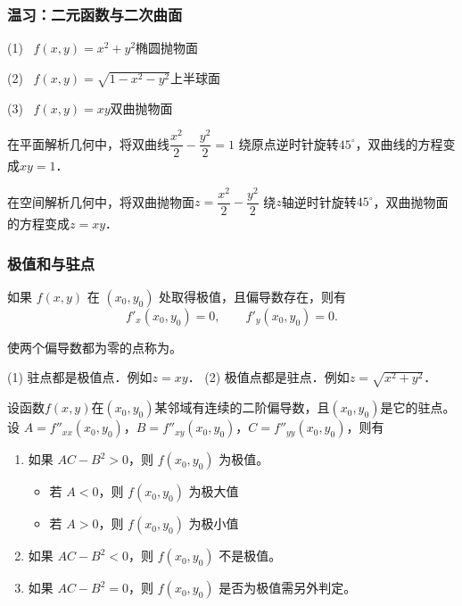 \documentclass[14pt,notheorems,leqno,xcolor={rgb}]{beamer} %
\begin{document}
\begin{rframe}
\frametitle{温习：二元函数与二次曲面}
(1) \ $f(x,y)=x^2+y^2$\cdotfill 椭圆抛物面\par
(2) \ $f(x,y)=\sqrt{1-x^2-y^2}$\cdotfill 上半球面\par
(3) \ $f(x,y)=xy$\cdotfill 双曲抛物面
\begin{remark*}
在平面解析几何中，将双曲线$\dfrac{x^2}{2}-\dfrac{y^2}{2}=1$
绕原点逆时针旋转$45^\circ$，双曲线的方程变成$xy=1$．\par
在空间解析几何中，将双曲抛物面$z=\dfrac{x^2}{2}-\dfrac{y^2}{2}$
绕$z$轴逆时针旋转$45^\circ$，双曲抛物面的方程变成$z=xy$．
\end{remark*}
\end{rframe}

\begin{frame}
\frametitle{极值和与驻点}
\begin{theorem}[极值的必要条件]
如果 $f(x,y)$ 在 $(x_0,y_0)$ 处取得极值，且偏导数存在，\pause 则有
\[ f'_x(x_0,y_0)=0,\qquad f'_y(x_0,y_0)=0. \]
\end{theorem}
\vpause
\begin{definition*}
使两个偏导数都为零的点称为。
\end{definition*}
\vpause
\begin{remark*}
(1) 驻点都是极值点．\pause 例如$z=xy$．%
\pause\newline
(2) 极值点都是驻点．\pause 例如$z=\sqrt{x^2+y^2}$．%
\end{remark*}
\end{frame}

\begin{frame}
\begin{theorem}[极值的充分条件]
设函数$f(x,y)$在$(x_0,y_0)$某邻域有连续的二阶偏导数，且$(x_0,y_0)$是它的驻点。\pause
设 $A=f''_{xx}(x_0,y_0)$，$B=f''_{xy}(x_0,y_0)$，$C=f''_{yy}(x_0,y_0)$，则有\pause
\begin{enumerate}[<+->][(1)]
  \item 如果 $AC-B^2>0$，则 $f(x_0,y_0)$ 为极值。
  \begin{itemize}[<+->]
    \item 若 $A<0$，则 $f(x_0,y_0)$ 为极大值
    \item 若 $A>0$，则 $f(x_0,y_0)$ 为极小值
  \end{itemize}
  \item 如果 $AC-B^2<0$，则 $f(x_0,y_0)$ 不是极值。
  \item 如果 $AC-B^2=0$，则 $f(x_0,y_0)$ 是否为极值需另外判定。
\end{enumerate}
\end{theorem}
\end{frame}
\end{document}

